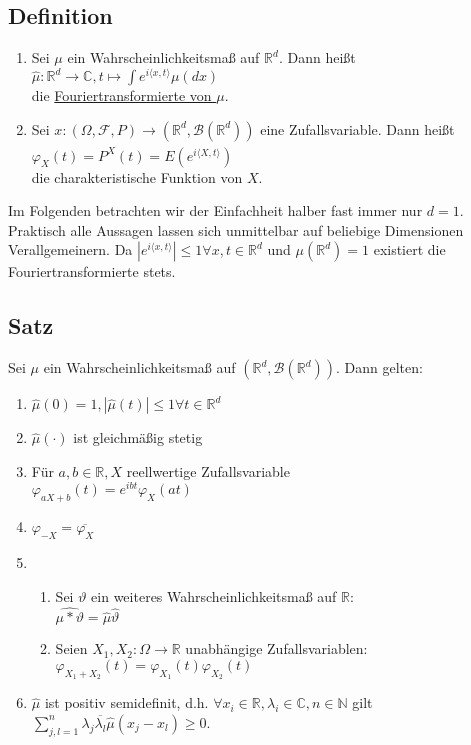 \documentclass[german,10pt,oneside, fleqn, a4paper]{article}
\newcommand {\R}	{\mathbb{R}}
\newcommand {\N}	{\mathbb{N}}
\newcommand {\C}	{\mathbb{C}}
\newcommand{\ra}{\rightarrow}
\newcommand{\sm}[2][\infty]{\sum\limits_{#2}^{#1}}
\newcommand{\brc}[1]{\left(#1\right)}
\newcommand{\mc}[1]{\mathcal{#1}}
\newcommand{\1}[1]{1_{#1}}
\newcommand{\2}[1]{\1{\brac{#1}}}
\newcommand{\rbor}[1][d]{\brc{\R^{#1},\mc{B}\brc{\R^{#1}}}}
\newcommand{\raum}{\brc{\Omega,\mc{F},P}}
\begin{document}
\subsection{Definition}
\label{4.1}
\begin{enumerate}[label=(\alph*)]
\item Sei $\mu$ ein Wahrscheinlichkeitsmaß auf $\R^d$. Dann heißt \\
$\widehat\mu:\R^d\ra\C, t\mapsto\int e^{i \langle x,t\rangle}\mu(dx)$\\
die \underline{Fouriertransformierte von $\mu$}.
\item Sei $x:\raum\ra\rbor$ eine Zufallsvariable. Dann heißt \\
$\varphi_X(t)=\widehat{P^X}(t)=E(e^{i\langle X,t\rangle})$\\
die charakteristische Funktion von $X$.
\end{enumerate}
Im Folgenden betrachten wir der Einfachheit halber fast immer nur $d=1$. Praktisch alle Aussagen lassen sich unmittelbar auf beliebige Dimensionen Verallgemeinern. Da $|e ^{i\langle x,t\rangle}|\leq 1\forall x,t\in\R^d$ und $\mu(\R^d)=1$ existiert die Fouriertransformierte stets.

\subsection{Satz}
\label{4.2}
Sei $\mu$ ein Wahrscheinlichkeitsmaß auf $\rbor$. Dann gelten:
\begin{enumerate}[label=(\alph*)]
\item $\widehat\mu(0)=1, |\widehat\mu(t)|\leq 1\forall t\in\R^d$
\item $\widehat\mu(\cdot)$ ist gleichmäßig stetig
\item Für $a,b\in\R, X$ reellwertige Zufallsvariable\\
$\varphi_{aX+b}(t)=e^{ibt}\varphi_X(at)$
\item $\varphi_{-X}=\overline{\varphi_X}$
\item \begin{enumerate}
\item Sei $\vartheta$ ein weiteres Wahrscheinlichkeitsmaß auf $\R$:\\
$\widehat{\mu*\vartheta}=\widehat\mu \widehat\vartheta$
\item Seien $X_1, X_2:\Omega\ra\R$ unabhängige Zufallsvariablen:\\
$\varphi_{X_1+X_2}(t)=\varphi_{X_1}(t)\varphi_{X_2}(t)$
\end{enumerate}
\item $\widehat{\mu}$ ist positiv semidefinit, d.h. $\forall x_i\in\R, \lambda_i\in\C, n\in\N$ gilt \\
$\sm[n]{j,l=1} \lambda_j\overline{\lambda_l}\widehat{\mu}(x_j-x_l)\geq0$.
\end{enumerate}
\end{document}
